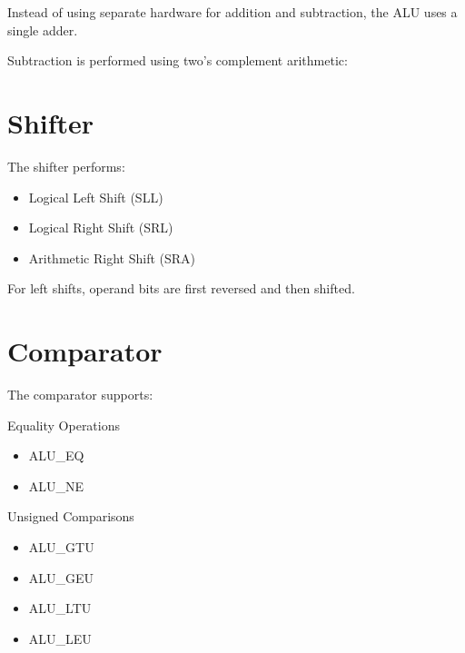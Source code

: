 \documentclass[letterpaper,10pt,english]{sphinxmanual}
\begin{document}
\sphinxAtStartPar
Instead of using separate hardware for addition and subtraction,
the ALU uses a single adder.

\sphinxAtStartPar
Subtraction is performed using two’s complement arithmetic:

\begin{sphinxVerbatim}[commandchars=\\\{\}]
        
\end{sphinxVerbatim}


\section{Shifter}
\label{\detokenize{alu_functionalblocks:shifter}}
\sphinxAtStartPar
The shifter performs:
\begin{itemize}
\item {} 
\sphinxAtStartPar
Logical Left Shift (SLL)

\item {} 
\sphinxAtStartPar
Logical Right Shift (SRL)

\item {} 
\sphinxAtStartPar
Arithmetic Right Shift (SRA)

\end{itemize}

\sphinxAtStartPar
For left shifts, operand bits are first reversed and then shifted.


\section{Comparator}
\label{\detokenize{alu_functionalblocks:comparator}}
\sphinxAtStartPar
The comparator supports:

\sphinxAtStartPar
Equality Operations
\begin{itemize}
\item {} 
\sphinxAtStartPar
ALU\_EQ

\item {} 
\sphinxAtStartPar
ALU\_NE

\end{itemize}

\sphinxAtStartPar
Unsigned Comparisons
\begin{itemize}
\item {} 
\sphinxAtStartPar
ALU\_GTU

\item {} 
\sphinxAtStartPar
ALU\_GEU

\item {} 
\sphinxAtStartPar
ALU\_LTU

\item {} 
\sphinxAtStartPar
ALU\_LEU

\end{itemize}
\end{document}
